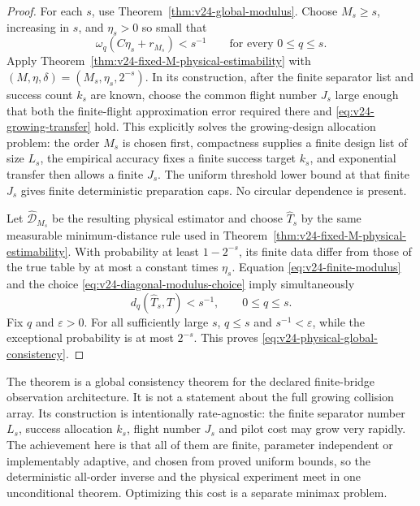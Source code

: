 \begin{proof}
For each \(s\), use Theorem~\ref{thm:v24-global-modulus}.  Choose
\(M_s\ge s\), increasing in \(s\), and \(\eta_s>0\) so small that
\begin{equation}\label{eq:v24-diagonal-modulus-choice}
 \omega_q(C\eta_s+r_{M_s})<s^{-1}
 \qquad\text{for every }0\le q\le s.
\end{equation}
Apply Theorem~\ref{thm:v24-fixed-M-physical-estimability} with
\((M,\eta,\delta)=(M_s,\eta_s,2^{-s})\).  In its construction, after the
finite separator list and success count \(k_s\) are known, choose the common
flight number \(J_s\) large enough that both the finite-flight approximation
error required there and \eqref{eq:v24-growing-transfer} hold.  This explicitly
solves the growing-design allocation problem: the order \(M_s\) is chosen
first, compactness supplies a finite design list of size \(L_s\), the empirical
accuracy fixes a finite success target \(k_s\), and exponential transfer then
allows a finite \(J_s\).  The uniform threshold lower bound at that finite
\(J_s\) gives finite deterministic preparation caps.  No circular dependence
is present.

Let \(\widehat{\mathcal D}_{M_s}\) be the resulting physical estimator and
choose \(\widehat T_s\) by the same measurable minimum-distance rule used in
Theorem~\ref{thm:v24-fixed-M-physical-estimability}.  With probability at least
\(1-2^{-s}\), its finite data differ from those of the true table by at most a
constant times \(\eta_s\).  Equation
\eqref{eq:v24-finite-modulus} and the choice
\eqref{eq:v24-diagonal-modulus-choice} imply simultaneously
\[
                         d_q(\widehat T_s,T)<s^{-1},
                         \qquad 0\le q\le s.
\]
Fix \(q\) and \(\varepsilon>0\).  For all sufficiently large \(s\),
\(q\le s\) and \(s^{-1}<\varepsilon\), while the exceptional probability is
at most \(2^{-s}\).  This proves
\eqref{eq:v24-physical-global-consistency}.
\end{proof}

\begin{remark}
\label{rem:v24-global-cost-scope}
The theorem is a global consistency theorem for the declared finite-bridge
observation architecture.  It is not a statement about the full growing
collision array.  Its construction is intentionally rate-agnostic: the
finite separator number \(L_s\), success allocation \(k_s\), flight number
\(J_s\) and pilot cost may grow very rapidly.  The achievement here is that
all of them are finite, parameter independent or implementably adaptive, and
chosen from proved uniform bounds, so the deterministic all-order inverse and
the physical experiment meet in one unconditional theorem.  Optimizing this
cost is a separate minimax problem.
\end{remark}
